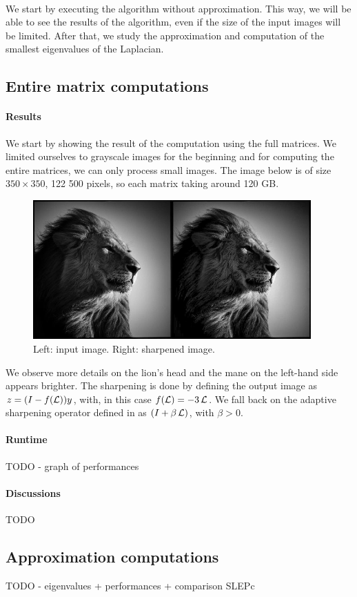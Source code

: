 \paragraph{}
We start by executing the algorithm without approximation.
This way, we will be able to see the results of the algorithm, even if the size of the input images will be limited.
After that, we study the approximation and computation of the smallest eigenvalues of the Laplacian.

\subsection{Entire matrix computations}

\paragraph{Results}
We start by showing the result of the computation using the full matrices.
We limited ourselves to grayscale images for the beginning and for computing the entire matrices, we can only process small images.
The image below is of size \(350 \times 350\), 122 500 pixels, so each matrix taking around 120 GB.

\begin{figure}[H]
  \centering
  \includegraphics[width=0.95\textwidth]{img/lion.png}
  \caption{Left: input image. Right: sharpened image.}
\end{figure}

We observe more details on the lion's head and the mane on the left-hand side appears brighter.
The sharpening is done by defining the output image as \(z = (I - f(\operatorname{\mathcal{L}}))y\), with, in this case \(f(\operatorname{\mathcal{L}}) = -3\operatorname{\mathcal{L}}\).
We fall back on the adaptive sharpening operator defined in \cite{siam_slides_2016} as \((I + \beta \operatorname{\mathcal{L}})\), with \(\beta > 0\).

\paragraph{Runtime}
TODO - graph of performances

\paragraph{Discussions}
TODO

\subsection{Approximation computations}
TODO - eigenvalues + performances + comparison SLEPc
